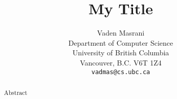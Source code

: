 \documentclass{article}
\title{My Title}
\author{
  Vaden Masrani \\
  Department of Computer Science\\
  University of British Columbia\\
  Vancouver, B.C. V6T 1Z4 \\
  \texttt{vadmas@cs.ubc.ca} \\
}
\begin{document}
\maketitle

\begin{abstract}
    Abstract
\end{abstract}

\glsresetall









\small


\newpage

\normalsize
% 
\end{document}

